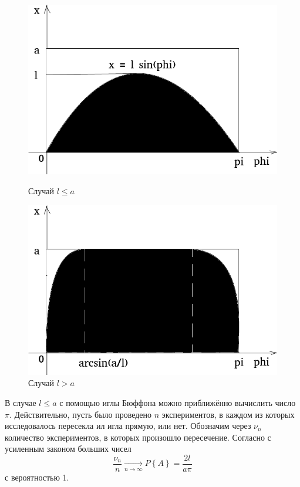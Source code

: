 \documentclass{book}
\begin{document}
\begin{figure}[h!]
  \centering
  \begin{minipage}[b]{0.4\textwidth}
    \includegraphics[width=\textwidth]{./pictures/4_201.png}
    \caption{Случай $l \leq a$}
    \label{fig:4201}
  \end{minipage}
  \hfill
  \begin{minipage}[b]{0.4\textwidth}
    \includegraphics[width=\textwidth]{./pictures/4_202.png}
    \caption{Случай $l > a$}
    \label{fig:4202}
  \end{minipage}
\end{figure}

В случае $l \leq a$ с помощью иглы Бюффона можно приближённо вычислить число $ \pi $.
Действительно, пусть было проведено $n$ экспериментов, в каждом из которых исследовалось пересекла ил игла прямую, или нет.
Обозначим через $ \nu_n$ количество экспериментов, в которых произошло пересечение.
Согласно с усиленным законом больших чисел
$$ \frac{ \nu_n}{n} \xrightarrow[n \rightarrow \infty ]{} P \left\{ A \right\} =
\frac{2l}{a \pi}$$
с вероятностью 1.
\end{document}
